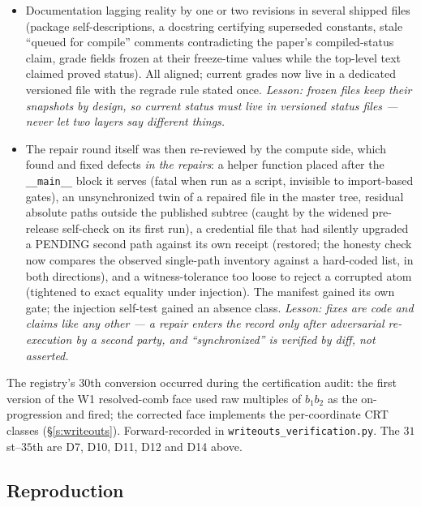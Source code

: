 \documentclass[11pt]{article}
\numberwithin{equation}{section}
\theoremstyle{definition}
\theoremstyle{remark}
\begin{document}
\begin{itemize}
including the pre-registered identity
$C_9+\{7,2\}=-\tfrac{75863}{302400}$ and the $\Sigma_9$
partition identity. \emph{Lesson: a headline constant without
a gate is a claim, not a result.}
\item[D32.] Documentation lagging reality by one or two
revisions in several shipped files (package self-descriptions,
a docstring certifying superseded constants, stale
``queued for compile'' comments contradicting the paper's
compiled-status claim, grade fields frozen at their
freeze-time values while the top-level text claimed proved
status). All aligned; current grades now live in a dedicated
versioned file with the regrade rule stated once.
\emph{Lesson: frozen files keep their snapshots by design, so
current status must live in versioned status files --- never
let two layers say different things.}
\item[D33.] The repair round itself was then re-reviewed by the
compute side, which found and fixed defects \emph{in the
repairs}: a helper function placed after the \texttt{\_\_main\_\_}
block it serves (fatal when run as a script, invisible to
import-based gates), an unsynchronized twin of a repaired
file in the master tree, residual absolute paths outside the
published subtree (caught by the widened pre-release
self-check on its first run), a credential file that had
silently upgraded a PENDING second path against its own
receipt (restored; the honesty check now compares the
observed single-path inventory against a hard-coded list, in
both directions), and a witness-tolerance too loose to reject
a corrupted atom (tightened to exact equality under
injection). The manifest gained its own gate; the injection
self-test gained an absence class. \emph{Lesson: fixes are
code and claims like any other --- a repair enters the record
only after adversarial re-execution by a second party, and
``synchronized'' is verified by diff, not asserted.}
\end{itemize}

\noindent The registry's $30$th conversion occurred during the
certification audit: the first version of the W1 resolved-comb
face
used raw multiples of $b_1b_2$ as the on-progression and fired;
the corrected face implements the per-coordinate CRT classes
(\S\ref{s:writeouts}). Forward-recorded in
\texttt{writeouts\_verification.py}. The $31$st--$35$th are
D7, D10, D11, D12 and D14 above.

\subsection*{Reproduction}
\end{document}
